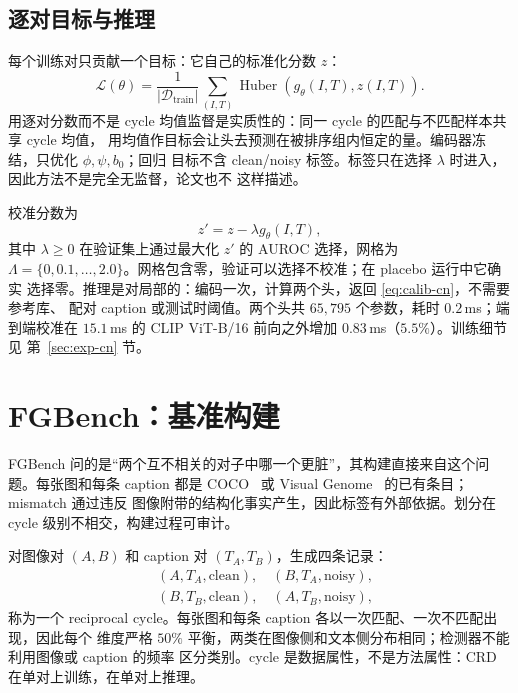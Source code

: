 \documentclass[10pt,twocolumn,a4paper]{ctexart}
\begin{document}
\subsection{逐对目标与推理}
每个训练对只贡献一个目标：它自己的标准化分数 $z$：
\begin{equation}
  \mathcal{L}(\theta)=\frac{1}{|\mathcal{D}_{\text{train}}|}
  \sum_{(I,T)}\operatorname{Huber}\!\left(g_\theta(I,T),z(I,T)\right).
  \label{eq:loss-cn}
\end{equation}
用逐对分数而不是 cycle 均值监督是实质性的：同一 cycle 的匹配与不匹配样本共享 cycle 均值，
用均值作目标会让头去预测在被排序组内恒定的量。编码器冻结，只优化 $\phi,\psi,b_0$；回归
目标不含 clean/noisy 标签。标签只在选择 $\lambda$ 时进入，因此方法不是完全无监督，论文也不
这样描述。

校准分数为
\begin{equation}
  z'=z-\lambda g_\theta(I,T),
  \label{eq:calib-cn}
\end{equation}
其中 $\lambda\ge0$ 在验证集上通过最大化 $z'$ 的 AUROC 选择，网格为
$\Lambda=\{0,0.1,\dots,2.0\}$。网格包含零，验证可以选择不校准；在 placebo 运行中它确实
选择零。推理是对局部的：编码一次，计算两个头，返回 \eqref{eq:calib-cn}，不需要参考库、
配对 caption 或测试时阈值。两个头共 $65{,}795$ 个参数，耗时 $0.2$\,ms；端到端校准在
$15.1$\,ms 的 CLIP ViT-B/16 前向之外增加 $0.83$\,ms（$5.5\%$）。训练细节见
第~\ref{sec:exp-cn} 节。

\section{FGBench：基准构建}
\label{sec:fgbench-cn}

FGBench 问的是“两个互不相关的对子中哪一个更脏”，其构建直接来自这个问题。每张图和每条
caption 都是 COCO~\cite{coco} 或 Visual Genome~\cite{vg} 的已有条目；mismatch 通过违反
图像附带的结构化事实产生，因此标签有外部依据。划分在 cycle 级别不相交，构建过程可审计。

对图像对 $(A,B)$ 和 caption 对 $(T_A,T_B)$，生成四条记录：
\begin{equation}
\begin{aligned}
  &(A,T_A,\text{clean}),\quad (B,T_A,\text{noisy}),\\
  &(B,T_B,\text{clean}),\quad (A,T_B,\text{noisy}),
\end{aligned}
\end{equation}
称为一个 reciprocal cycle。每张图和每条 caption 各以一次匹配、一次不匹配出现，因此每个
维度严格 $50\%$ 平衡，两类在图像侧和文本侧分布相同；检测器不能利用图像或 caption 的频率
区分类别。cycle 是数据属性，不是方法属性：CRD 在单对上训练，在单对上推理。
\end{document}
